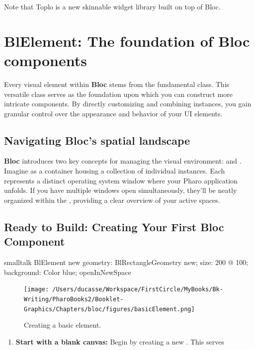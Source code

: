 \documentclass[10pt,twoside,english]{_support/latex/sbabook/sbabook}
\begin{document}
Note that Toplo is a new skinnable widget library built on top of Bloc.

\section{BlElement: The foundation of Bloc components}
Every visual element within \textbf{Bloc} stems from the fundamental class. This versatile class serves as the foundation upon which you can
construct more intricate components. By directly customizing and combining instances, you gain granular control over the appearance and
behavior of your UI elements.

\subsection{Navigating Bloc's spatial landscape}
\textbf{Bloc} introduces two key concepts for managing the visual environment: and . Imagine  as a container housing a
collection of individual  instances. Each  represents a
distinct operating system window where your Pharo application unfolds. If you
have multiple windows open simultaneously, they'll be neatly organized within
the , providing a clear overview of your active spaces.

\subsection{Ready to Build: Creating Your First Bloc Component}\begin{displaycode}{smalltalk}
BlElement new
	geometry: BlRectangleGeometry  new;
	size: 200 @ 100;
	background: Color blue;
	openInNewSpace
\end{displaycode}

\begin{figure}[htpb]
\begin{center}
\texttt{[image: /Users/ducasse/Workspace/FirstCircle/MyBooks/Bk-Writing/PharoBooks2/Booklet-Graphics/Chapters/bloc/figures/basicElement.png]}
\caption{Creating a basic element.}
\end{center}
\end{figure}


\begin{enumerate}
    \item \textbf{Start with a blank canvas:} Begin by creating a new . This serves
\end{enumerate}
\end{document}
